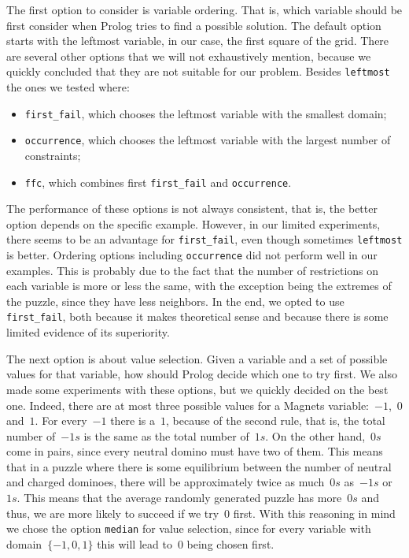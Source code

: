 \documentclass{llncs}
\begin{document}
The first option to consider is variable ordering. That is, which variable should be first consider when Prolog tries to find a possible solution. The default option starts with the leftmost variable, in our case, the first square of the grid. There are several other options that we will not exhaustively mention, because we quickly concluded that they are not suitable for our problem. Besides \verb|leftmost| the ones we tested where:
\begin{itemize}
	\item \verb|first_fail|, which chooses the leftmost variable with the smallest domain;
	\item \verb|occurrence|, which chooses the leftmost variable with the largest number of constraints;
	\item \verb|ffc|, which combines first \verb|first_fail| and \verb|occurrence|.
\end{itemize}
The performance of these options is not always consistent, that is, the better option depends on the specific example. However, in our limited experiments, there seems to be an advantage for \verb|first_fail|, even though sometimes \verb|leftmost| is better. Ordering options including \verb|occurrence| did not perform well in our examples. This is probably due to the fact that the number of restrictions on each variable is more or less the same, with the exception being the extremes of the puzzle, since they have less neighbors. In the end, we opted to use \verb|first_fail|, both because it makes theoretical sense and because there is some limited evidence of its superiority.

The next option is about value selection. Given a variable and a set of possible values for that variable, how should Prolog decide which one to try first. We also made some experiments with these options, but we quickly decided on the best one. Indeed, there are at most three possible values for a Magnets variable:~$-1$,~$0$ and~$1$. For every~$-1$ there is a~$1$, because of the second rule, that is, the total number of~$-1s$ is the same as the total number of~$1s$. On the other hand,~$0s$ come in pairs, since every neutral domino must have two of them. This means that in a puzzle where there is some equilibrium between the number of neutral and charged dominoes, there will be approximately twice as much~$0s$ as~$-1s$ or~$1s$. This means that the average randomly generated puzzle has more~$0s$ and thus, we are more likely to succeed if we try~$0$ first. With this reasoning in mind we chose the option \verb|median| for value selection, since for every variable with domain~$\{-1, 0, 1\}$ this will lead to~$0$ being chosen first.
\end{document}

